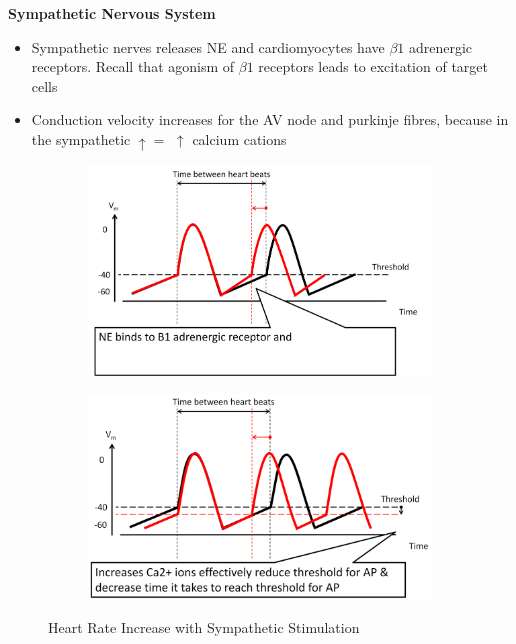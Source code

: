 \documentclass[11pt,fleqn]{book} %
\begin{document}
\textbf{Sympathetic
Nervous System}
\begin{itemize}
    \item Sympathetic nerves releases NE and
cardiomyocytes have $\beta1$ adrenergic receptors.
Recall that agonism of $\beta1$ receptors leads to
excitation of target cells
    \item Conduction velocity increases for the AV node and purkinje fibres, because in the sympathetic $\uparrow=$ $\uparrow$ calcium cations
\end{itemize}

\begin{figure}[h!]
    \centering
    \begin{subfigure}{0.45\textwidth}
        \includegraphics[width=\textwidth]{Pictures/Screenshot 2024-04-04 012102.png}
    \end{subfigure}
    \hfill
    \begin{subfigure}{0.45\textwidth}
        \includegraphics[width=\textwidth]{Pictures/Screenshot 2024-04-04 012129.png}
    \end{subfigure}
    \caption{Heart Rate Increase with
Sympathetic Stimulation}
\end{figure}
\end{document}
